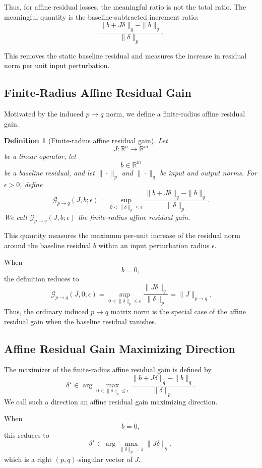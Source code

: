 \documentclass{article}
\newtheorem{definition}{Definition}
\begin{document}
Thus, for affine residual losses, the meaningful ratio is not the total ratio. The meaningful quantity is the baseline-subtracted increment ratio:
\[
\frac{
\|b+J\delta\|_q-\|b\|_q
}{
\|\delta\|_p
}.
\]

This removes the static baseline residual and measures the increase in residual norm per unit input perturbation.

\subsection{Finite-Radius Affine Residual Gain}

Motivated by the induced $p\to q$ norm, we define a finite-radius affine residual gain.

\begin{definition}[Finite-radius affine residual gain]
Let
\[
J:\mathbb R^n\to\mathbb R^m
\]
be a linear operator, let
\[
b\in\mathbb R^m
\]
be a baseline residual, and let $\|\cdot\|_p$ and $\|\cdot\|_q$ be input and output norms. For $\epsilon>0$, define
\[
\mathcal G_{p\to q}(J,b;\epsilon)
=
\sup_{0<\|\delta\|_p\le\epsilon}
\frac{
\|b+J\delta\|_q-\|b\|_q
}{
\|\delta\|_p
}.
\]
We call $\mathcal G_{p\to q}(J,b;\epsilon)$ the finite-radius affine residual gain.
\end{definition}

This quantity measures the maximum per-unit increase of the residual norm around the baseline residual $b$ within an input perturbation radius $\epsilon$.

When
\[
b=0,
\]
the definition reduces to
\[
\mathcal G_{p\to q}(J,0;\epsilon)
=
\sup_{0<\|\delta\|_p\le\epsilon}
\frac{\|J\delta\|_q}{\|\delta\|_p}
=
\|J\|_{p\to q}.
\]
Thus, the ordinary induced $p\to q$ matrix norm is the special case of the affine residual gain when the baseline residual vanishes.

\subsection{Affine Residual Gain Maximizing Direction}

The maximizer of the finite-radius affine residual gain is defined by
\[
\delta^\star
\in
\arg\max_{0<\|\delta\|_p\le\epsilon}
\frac{
\|b+J\delta\|_q-\|b\|_q
}{
\|\delta\|_p
}.
\]
We call such a direction an affine residual gain maximizing direction.

When
\[
b=0,
\]
this reduces to
\[
\delta^\star
\in
\arg\max_{\|\delta\|_p=1}
\|J\delta\|_q,
\]
which is a right $(p,q)$-singular vector of $J$.
\end{document}
